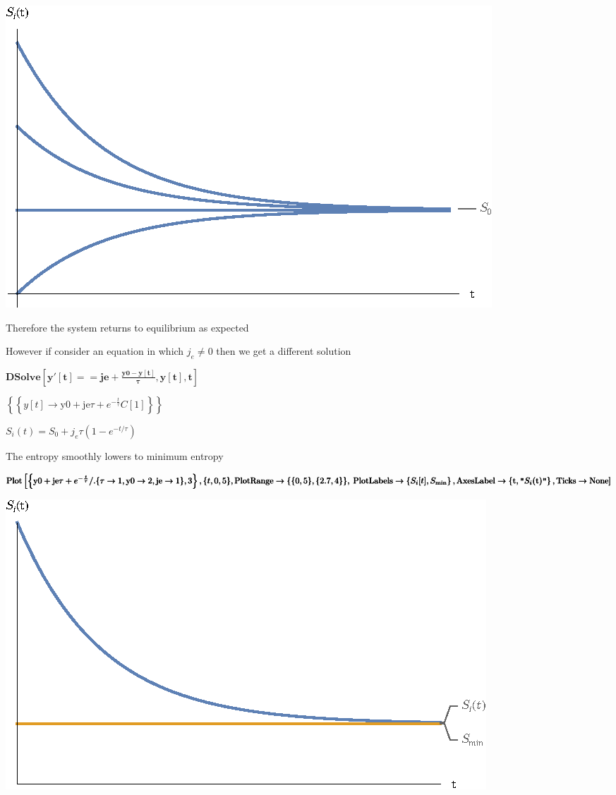 \documentclass{article}
\begin{document}
\includegraphics{Benard Cell_gr2.eps}

Therefore the system returns to equilibrium as expected

However if consider an equation in which \(j_e\neq 0\) then we get a different solution

\begin{doublespace}
\noindent\(\pmb{\text{DSolve}\left[y'[t]==\text{je}+\frac{\text{y0}-y[t]}{\tau },y[t],t\right]}\)
\end{doublespace}

\begin{doublespace}
\noindent\(\left\{\left\{y[t]\to \text{y0}+\text{je} \tau +e^{-\frac{t}{\tau }} C[1]\right\}\right\}\)
\end{doublespace}

\(S_i(t)=S_0+j_e\tau \left(1-e^{-t/\tau }\right)\)

The entropy smoothly lowers to minimum entropy

\begin{doublespace}
\noindent\(\pmb{\text{Plot}\left[\left\{\text{y0}+\text{je} \tau +e^{-\frac{t}{\tau }} \text{/.}\{\tau \to 1,\text{y0}\to 2,\text{je}\to 1\},3\right\},\{t,0,5\},\text{PlotRange}\to
\{\{0,5\},\{2.7,4\}\},\right.}\\
\pmb{\left.\text{PlotLabels}\to \left\{S_i[t],S_{\min }\right\},\text{AxesLabel}\to \left\{\text{t},\texttt{"}S_i\text{(t)$\texttt{"}$}\right\},\text{Ticks}\to
\text{None}\right]}\)
\end{doublespace}

\includegraphics{Benard Cell_gr3.eps}
\end{document}

